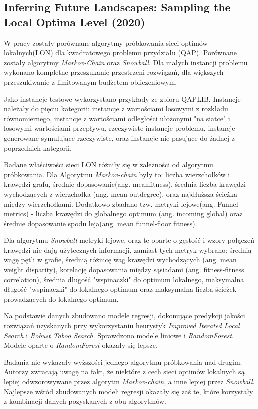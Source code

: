 \subsection*{Inferring Future Landscapes: Sampling the Local Optima Level (2020) \cite{DBLP:journals/ec/ThomsonOVV20}}
W pracy zostały porównane algorytmy próbkowania sieci optimów lokalnych(LON) dla kwadratowego problemu przydziału (QAP).
Porównane zostały algorytmy \textit{Markov-Chain} oraz \textit{Snowball}.
Dla małych instancji problemu wykonano kompletne przeszukanie przestrzeni rozwiązań,
dla większych - przeszukiwanie z limitowanym budżetem obliczeniowym.

Jako instancje testowe wykorzystano przykłady ze zbioru QAPLIB.
Instancje należały do pięciu kategorii: instancje z wartościami losowymi z rozkładu równomiernego,
instancje z wartościami odległości ułożonymi "na siatce" i losowymi wartościami przepływu, rzeczywiste instancje problemu,
instancje generowane symulujące rzeczywiste, oraz instancje nie pasujące do żadnej z poprzednich kategorii.

Badane właściwości sieci LON różniły się w zależności od algorytmu próbkowania.
Dla Algorytmu \textit{Markov-chain} były to: liczba wierzchołków i krawędzi grafu, średnie dopasowanie(ang. meanfitness),
średnia liczba krawędzi wychodzących z wierzchołka (ang. mean outdegree), oraz najdłuższa ścieżka między wierzchołkami.
Dodatkowo zbadano tzw. metryki lejowe(ang. Funnel metrics) - liczba krawędzi do globalnego optimum (ang. incoming global)
oraz średnie dopasowanie spodu leja(ang. mean funnel-floor fitness).

Dla algorytmu \textit{Snowball} metryki lejowe, oraz te oparte o gęstość i wzory połączeń krawędzi nie dają użytecznych informacji,
zamiast tych metryk wybrano: średnią wagę pętli w grafie, średnią różnicę wag krawędzi wychodzących (ang. mean weight disparity),
korelację dopasowania między sąsiadami (ang. fitness-fitness correlation), średnia długość "wspinaczki" do optimum lokalnego,
maksymalna długość "wspinaczki" do lokalnego optimum oraz maksymalna liczba ścieżek prowadzących do lokalnego optimum.

Na podstawie danych zbudowano modele regresji, dokonujące predykcji jakości rozwiązań
uzyskanych przy wykorzystaniu heurystyk \textit{Improved Iterated Local Search} i \textit{Robust Taboo Search}.
Sprawdzono modele liniowe i \textit{RandomForest}. Modele oparte o \textit{RandomForest} okazały się lepsze.

Badania nie wykazały wyższości jednego algorytmu próbkowania nad drugim. Autorzy zwracają uwagę na fakt, że niektóre z cech
sieci optimów lokalnych są lepiej odwzorowywane przez algorytm \textit{Markov-chain}, a inne lepiej przez \textit{Snowball}.
Najlepsze wśród zbudowanych modeli regresji okazały się zaś te, które korzystały z kombinacji danych pozyskanych z obu algorytmów.

